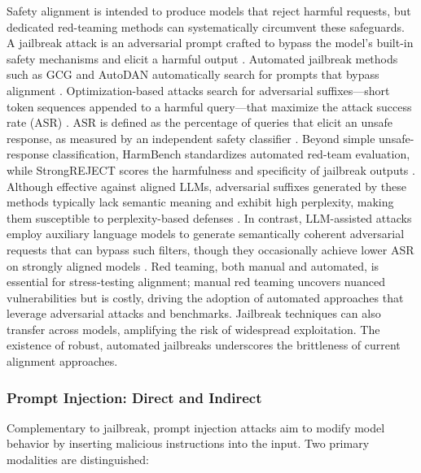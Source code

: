 \documentclass[11pt,a4paper]{article}
\begin{document}
Safety alignment is intended to produce models that reject harmful requests, but dedicated red-teaming methods can systematically circumvent these safeguards. A jailbreak attack is an adversarial prompt crafted to bypass the model's built-in safety mechanisms and elicit a harmful output \cite{Kim_2025_LLM_2523db75, Ying_2024_Jailbreak_1125d3ba}. Automated jailbreak methods such as GCG and AutoDAN automatically search for prompts that bypass alignment \cite{Zou_2023_Universal_ab8745c2, Liu_2024_AutoDAN_1d6cff47}. Optimization-based attacks search for adversarial suffixes---short token sequences appended to a harmful query---that maximize the attack success rate (ASR) \cite{Zheng_2024_Improved_67ad35e0}. ASR is defined as the percentage of queries that elicit an unsafe response, as measured by an independent safety classifier \cite{Dang_2025_Rainbowplus_b158c5a2}. Beyond simple unsafe-response classification, HarmBench standardizes automated red-team evaluation, while StrongREJECT scores the harmfulness and specificity of jailbreak outputs \cite{Mazeika_2024_HarmBench, Souly_2024_StrongREJECT}. Although effective against aligned LLMs, adversarial suffixes generated by these methods typically lack semantic meaning and exhibit high perplexity, making them susceptible to perplexity-based defenses \cite{Zheng_2024_Improved_67ad35e0}. In contrast, LLM-assisted attacks employ auxiliary language models to generate semantically coherent adversarial requests that can bypass such filters, though they occasionally achieve lower ASR on strongly aligned models \cite{Zheng_2024_Improved_67ad35e0}. Red teaming, both manual and automated, is essential for stress-testing alignment; manual red teaming uncovers nuanced vulnerabilities but is costly, driving the adoption of automated approaches that leverage adversarial attacks and benchmarks. Jailbreak techniques can also transfer across models, amplifying the risk of widespread exploitation. The existence of robust, automated jailbreaks underscores the brittleness of current alignment approaches.

\subsubsection{Prompt Injection: Direct and Indirect}

Complementary to jailbreak, prompt injection attacks aim to modify model behavior by inserting malicious instructions into the input. Two primary modalities are distinguished:
\end{document}
